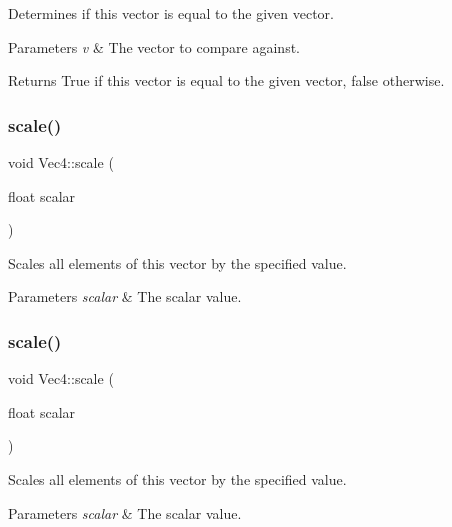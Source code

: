 Determines if this vector is equal to the given vector.


\begin{DoxyParams}{Parameters}
{\em v} & The vector to compare against.\\
\hline
\end{DoxyParams}
\begin{DoxyReturn}{Returns}
True if this vector is equal to the given vector, false otherwise. 
\end{DoxyReturn}
\mbox{\label{classVec4_af97ed4fd28d88565faef29814467e057}} 
\subsubsection{\texorpdfstring{scale()}{scale()}\hspace{0.1cm}{\footnotesize\ttfamily [1/2]}}
{\footnotesize\ttfamily void Vec4\+::scale (\begin{DoxyParamCaption}\item[{float}]{scalar }\end{DoxyParamCaption})}

Scales all elements of this vector by the specified value.


\begin{DoxyParams}{Parameters}
{\em scalar} & The scalar value. \\
\hline
\end{DoxyParams}
\mbox{\label{classVec4_af97ed4fd28d88565faef29814467e057}} 
\subsubsection{\texorpdfstring{scale()}{scale()}\hspace{0.1cm}{\footnotesize\ttfamily [2/2]}}
{\footnotesize\ttfamily void Vec4\+::scale (\begin{DoxyParamCaption}\item[{float}]{scalar }\end{DoxyParamCaption})}

Scales all elements of this vector by the specified value.


\begin{DoxyParams}{Parameters}
{\em scalar} & The scalar value. \\
\hline
\end{DoxyParams}
\mbox{\label{classVec4_a65e2bb85e21dc0a4aca4a6f6348b0d48}} 
